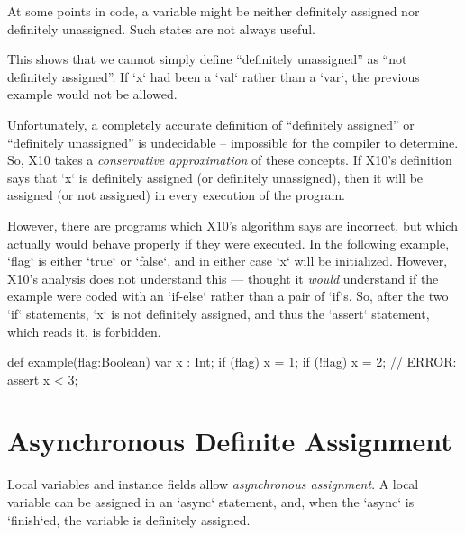 At some points in code, a variable might be neither definitely assigned nor
definitely unassigned.    Such states are not always useful.  
% 
\begin{xten}
def example(flag : Boolean) {
  var x : Int;
  if (flag) x = 1;
  // x is neither def. assigned nor unassigned.
  x = 2; 
  // x is def. assigned.
\end{xten}
This shows that we cannot simply define ``definitely unassigned'' as ``not
definitely assigned''.   If \xcd`x` had been a \xcd`val` rather than a
\xcd`var`, the previous example would not be allowed.    

Unfortunately, a completely accurate definition of ``definitely assigned''
or ``definitely unassigned'' is undecidable -- impossible for the compiler to
determine.  So, X10 takes a {\em conservative approximation} of these
concepts.  If X10's definition says that \xcd`x` is definitely assigned (or
definitely unassigned), then it will be assigned (or not assigned) in every
execution of the program.  

However, there are programs which X10's algorithm says are incorrect, but
which actually would behave properly if they were executed.   In the following
example, \xcd`flag` is either \xcd`true` or \xcd`false`, and in either case
\xcd`x` will be initialized.  However, X10's analysis does not understand this
--- thought it {\em would} understand if the example were coded with an
\xcd`if-else` rather than a pair of \xcd`if`s.  So, after the two \xcd`if`
statements, \xcd`x` is not definitely assigned, and thus the \xcd`assert`
statement, which reads it, is forbidden.  
\begin{xten}
def example(flag:Boolean) {
  var x : Int;
  if (flag) x = 1;
  if (!flag) x = 2;
  // ERROR: assert x < 3;
}
\end{xten}

\section{Asynchronous Definite Assignment}


Local variables and instance fields allow {\em asynchronous assignment}. A local
variable can be assigned in an \xcd`async` statement, and, when the
\xcd`async` is \xcd`finish`ed, the variable is definitely assigned.  

